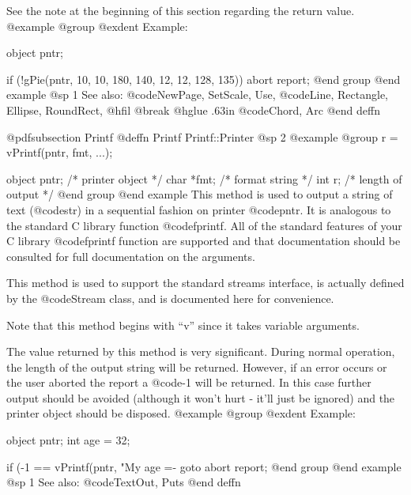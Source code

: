 See the note at the beginning of this section regarding the return value.
@example
@group
@exdent Example:

object  pntr;

if (!gPie(pntr, 10, 10, 180, 140, 12, 12, 128, 135))
        abort report;
@end group
@end example
@sp 1
See also:  @code{NewPage, SetScale, Use,}
        @code{Line, Rectangle, Ellipse, RoundRect,}
@hfil @break @hglue .63in @code{Chord, Arc}
@end deffn
















@pdfsubsection {Printf}
@deffn {Printf} Printf::Printer
@sp 2
@example
@group
r = vPrintf(pntr, fmt, ...);

object   pntr;  /*  printer object     */
char    *fmt;   /*  format string      */
int      r;     /*  length of output   */
@end group
@end example
This method is used to output a string of text (@code{str}) in a sequential
fashion on printer @code{pntr}.  It is analogous to the standard C library
function @code{fprintf}.  All of the standard features of your C library
@code{fprintf} function are supported and that documentation should be
consulted for full documentation on the arguments.

This method is used to support the standard streams interface, is
actually defined by the @code{Stream} class, and is documented here for
convenience.

Note that this method begins with ``v'' since it takes variable arguments.

The value returned by this method is very significant.  During normal
operation, the length of the output string will be returned.  However,
if an error occurs or the user aborted the report a @code{-1} will be
returned.  In this case further output should be avoided (although it
won't hurt - it'll just be ignored) and the printer object should be
disposed.
@example
@group
@exdent Example:

object  pntr;
int     age = 32;

if (-1 == vPrintf(pntr, "My age =- %
        goto abort report;
@end group
@end example
@sp 1
See also:  @code{TextOut, Puts}
@end deffn














